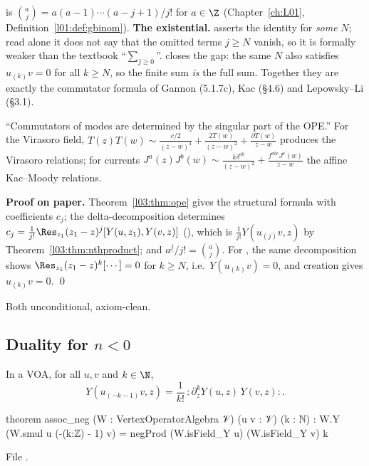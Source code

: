 \begin{dictionary}
 is $\binom aj = a(a-1)\cdots(a-j+1)/j!$ for $a\in\Z$ (Chapter~\ref{ch:L01}, Definition~\ref{l01:def:gbinom}).
\textbf{The existential.}  asserts the identity for \emph{some} $N$; read
alone it does not say that the omitted terms $j\ge N$ vanish, so it is formally weaker than the
textbook ``$\sum_{j\ge0}$''.  closes the gap: the same $N$ also satisfies
$u_{(k)}v = 0$ for all $k\ge N$, so the finite sum \emph{is} the full sum. Together they are exactly
the commutator formula of Gannon (5.1.7c), Kac (§4.6) and Lepowsky--Li (§3.1).
\end{dictionary}

\begin{physics}
``Commutators of modes are determined by the singular part of the OPE.'' For the Virasoro field,
$T(z)T(w)\sim\frac{c/2}{(z-w)^4}+\frac{2T(w)}{(z-w)^2}+\frac{\partial T(w)}{z-w}$ produces the Virasoro
relations; for currents $J^a(z)J^b(w)\sim\frac{k\delta^{ab}}{(z-w)^2}+\frac{f^{abc}J^c(w)}{z-w}$ the
affine Kac--Moody relations.
\end{physics}

\textbf{Proof on paper.} Theorem~\ref{l03:thm:ope} gives the structural formula with coefficients
$c_j$; the delta-decomposition determines $c_j = \frac1{j!}\Res_{z_1}(z_1-z)^j[Y(u,z_1),Y(v,z)]$
(), which is $\frac1{j!}Y(u_{(j)}v,z)$ by Theorem~\ref{l03:thm:nthproduct}; and
$a^{\underline j}/j! = \binom aj$. For , the same decomposition shows
$\Res_{z_1}(z_1-z)^k[\cdots] = 0$ for $k\ge N$, i.e.\ $Y(u_{(k)}v) = 0$, and creation gives $u_{(k)}v = 0$. \qed

\begin{status}
Both unconditional, axiom-clean.
\end{status}

\subsection{Duality for \texorpdfstring{$n<0$}{n < 0}}

\begin{theorem}\label{l03:thm:assocneg}
In a VOA, for all $u,v$ and $k\in\N$,
\begin{equation*}
Y(u_{(-k-1)}v,z) = \frac1{k!}\,{:}\partial_z^kY(u,z)\,Y(v,z){:}.
\end{equation*}
\end{theorem}
\begin{leancode}
theorem assoc_neg (W : VertexOperatorAlgebra 𝒱) (u v : 𝒱) (k : ℕ) :
    W.Y (W.smul u (-(k:ℤ) - 1) v) = negProd (W.isField_Y u) (W.isField_Y v) k
\end{leancode}
File .

